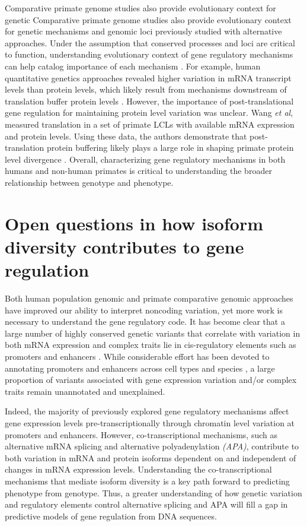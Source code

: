 Comparative primate genome studies also provide evolutionary context for genetic Comparative primate genome studies also provide evolutionary context for genetic mechanisms and genomic loci previously studied with alternative approaches. Under the assumption that conserved processes and loci are critical to function, understanding evolutionary context of gene regulatory mechanisms can help catalog importance of each mechanism \citep{housman_prime_2020}. For example, human quantitative genetics approaches revealed higher variation in mRNA transcript levels than protein levels, which likely result from mechanisms downstream of translation buffer protein levels \citep{battle_impact_2015}. However, the importance of post-translational gene regulation for maintaining protein level variation was unclear. Wang \emph{et al}, measured translation in a set of primate LCLs with available mRNA expression and protein levels. Using these data, the authors demonstrate that post-translation protein buffering likely plays a large role in shaping primate protein level divergence \citep{wang_post-translational_2018}. Overall, characterizing gene regulatory mechanisms in both humans and non-human primates is critical to understanding the broader relationship between genotype and phenotype. 

\section{Open questions in how isoform diversity contributes to gene regulation}

Both human population genomic and primate comparative genomic approaches have improved our ability to interpret noncoding variation, yet more work is necessary to understand the gene regulatory code.  It has become clear that a large number of highly conserved genetic variants that correlate with variation in both mRNA expression and complex traits lie in cis-regulatory elements such as promoters and enhancers \citep{maurano_systematic_2012, Trynka2013, zhou_epigenetic_2014}. While considerable effort has been devoted to annotating promoters and enhancers across cell types and species \citep{bernstein_nih_2010, the_encode_project_consortium_integrated_2012, mouse_encode_consortium_encyclopedia_2012, modencode_consortium_unlocking_2009}, a large proportion of variants associated with gene expression variation and/or complex traits remain unannotated and unexplained.

Indeed, the majority of previously explored gene regulatory mechanisms affect gene expression levels pre-transcriptionally through chromatin level variation at promoters and enhancers. However, co-transcriptional mechanisms, such as alternative mRNA splicing and alternative polyadenylation \emph{(APA)}, contribute to both variation in mRNA and protein isoforms dependent on and independent of changes in mRNA expression levels. Understanding the co-transcriptional mechanisms that mediate isoform diversity is a key path forward to predicting phenotype from genotype.  Thus, a greater understanding of how genetic variation and regulatory elements control alternative splicing and APA will fill a gap in predictive models of gene regulation from DNA sequences.

